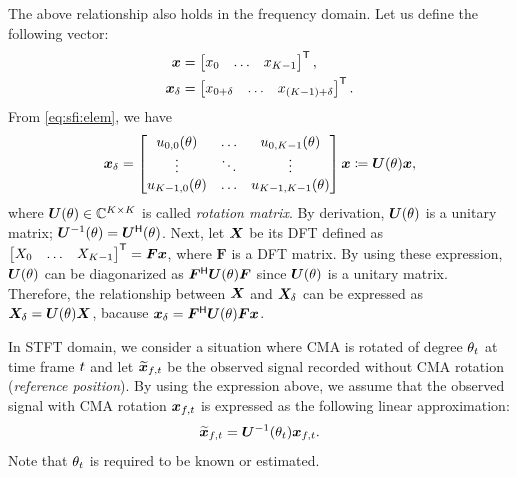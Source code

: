 \documentclass[sip,biber]{now-journal}
\begin{document}
The above relationship also holds in the frequency domain.
Let us define the following vector:
\begin{align}
  \bm{x} &= \begin{bmatrix} x _{0} & \dots & x _{K - 1} \end{bmatrix} ^{\mathsf{T}}, \\
  \bm{x} _{\delta} &= \begin{bmatrix} x _{0+\delta} & \dots & x _{(K - 1)+\delta} \end{bmatrix} ^{\mathsf{T}}.
\end{align}
From \eqref{eq:sfi:elem}, we have
\begin{equation}
  \bm{x} _{\delta}
  =
  \begin{bmatrix}
    u _{0, 0}(\theta) & \dots & u _{0, K - 1}(\theta) \\
    \vdots & \ddots & \vdots \\
    u _{K - 1, 0}(\theta) & \dots & u _{K - 1, K - 1}(\theta)
  \end{bmatrix}
  \bm{x}
  \coloneqq
  \bm{U} (\theta) \bm{x},
  \label{eq:rotmat}
\end{equation}
where $\bm{U} (\theta) \in \mathbb{C} ^{K\times K}$ is called \emph{rotation matrix}.
By derivation, $\bm{U} (\theta)$ is a unitary matrix; $\bm{U} ^{-1} (\theta) = \bm{U} ^{\mathsf{H}} (\theta)$.
Next, let $\bm{X}$ be its DFT defined as $\begin{bmatrix} X _{0} & \dots & X _{K - 1}\end{bmatrix} ^{\mathsf{T}} = \bm{F} \bm{x}$, where $\bm{F}$ is a DFT matrix.
By using these expression, $\bm{U} (\theta)$ can be diagonarized as $\bm{F}^{\mathsf{H}} \bm{U} (\theta) \bm{F}$ since $\bm{U} (\theta)$ is a unitary matrix.
Therefore, the relationship between $\bm{X}$ and $\bm{X} _{\delta}$ can be expressed as $\bm{X} _{\delta} = \bm{U} (\theta) \bm{X}$,
bacause $\bm{x} _{\delta} = \bm{F}^{\mathsf{H}} \bm{U} (\theta) \bm{F} \bm{x}$.

In STFT domain, we consider a situation where CMA is rotated of degree $\theta _{t}$ at time frame $t$ and let $\refpos{\Obs} _{\ft}$ be the observed signal recorded without CMA rotation (\emph{reference position}).
By using the expression above, we assume that the observed signal with CMA rotation $\Obs _{\ft}$ is expressed as the following linear approximation:
\begin{equation}
  \refpos{\Obs} _{\ft} = \rotMat ^{-1} (\rotSpat _{\tframe}) \Obs _{\ft}.
\end{equation}
Note that $\theta _{t}$ is required to be known or estimated.
\end{document}
